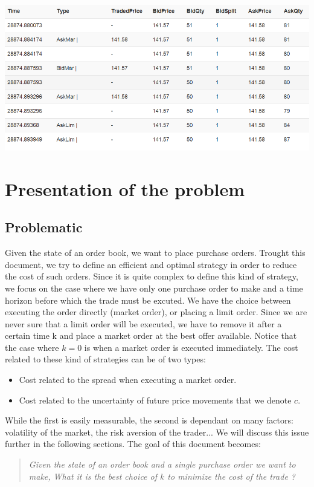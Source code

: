 \documentclass{article}
\begin{document}
\includegraphics[scale=0.75]{img/donnees.png}

\tableofcontents

\section{Presentation of the problem}

\subsection{Problematic}
Given the state of an order book, we want to place purchase orders. Trought this document, we try to define an efficient and optimal strategy in order to reduce the cost of such orders. Since it is quite complex to define this kind of strategy, we focus on the case where we have only one purchase order to make and a time horizon before which the trade must be excuted. We have the choice between executing the order directly (market order), or placing a limit order. Since we are never sure that a limit order will be executed, we have to remove it after a certain time k and place a market order at the best offer available. Notice that the case where $k = 0$ is when a market order is executed immediately.
The cost related to these kind of strategies can be of two types:

\begin{itemize}
	\item Cost related to the spread when executing a market order.
	\item Cost related to the uncertainty of future price movements that we denote $c$.
\end{itemize}
While the first is easily measurable, the second is dependant on many factors: volatility of the market, the risk aversion of the trader... 
We will discuss this issue further in the following sections.
The goal of this document becomes:
\begin{quote}
\textit{Given the state of an order book and a single purchase order we want to make, What it is the best choice of $k$ to minimize the cost of the trade  ?}
\end{quote}
\end{document}
